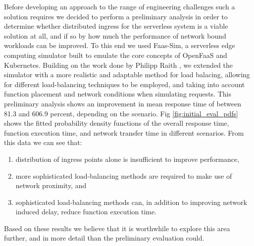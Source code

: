 Before developing an approach to the range of engineering challenges such a solution requires we decided to perform a preliminary analysis in order to determine whether distributed ingress for the serverless system is a viable solution at all, and if so by how much the performance of network bound workloads can be improved.
To this end we used Faas-Sim\cite{faas-sim-github},
a serverless edge computing simulator built to emulate the core concepts of OpenFaaS and Kubernetes. Building on the work done by Philipp Raith \cite{philipp-da},
we extended the simulator with a more realistic and adaptable method for load balacing, allowing for different load-balancing techniques to be employed, and taking into account function placement and network conditions when simulating requests.%
This preliminary analysis shows an improvement in mean response time of between 81.3 and 606.9 percent, depending on the scenario. Fig \ref{fig:initial_eval_pdfs}
shows the fitted probability density functions of the overall response time, function execution time, and network transfer time in different scenarios. From this data we can see that:
\begin{enumerate}
    \item distribution of ingress points alone is insufficient to improve performance,
    \item more sophisticated load-balancing methods are required to make use of network proximity, and
    \item sophisticated load-balancing methods can, in addition to improving network induced delay, reduce function execution time.
\end{enumerate}
Based on these results we believe that it is worthwhile to explore this area further, and in more detail than the preliminary evaluation could.

